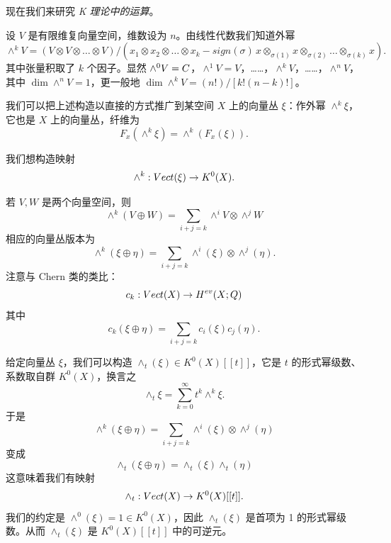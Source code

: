 现在我们来研究 \emph{K 理论中的运算}。

设 $V$ 是有限维复向量空间，维数设为 $n$。由线性代数我们知道外幂
\[ \wedge^k V = (V\otimes V\otimes\ldots\otimes V)/(x_1\otimes x_2\otimes\ldots\otimes x_k - sign(\sigma)\,x\otimes_{\sigma(1)}x\otimes_{\sigma(2)}\ldots\otimes_{\sigma(k)}x). \]
其中张量积取了 $k$ 个因子。显然 $\wedge^0V = C$，$\wedge^1V = V$，……，$\wedge^kV$，……，$\wedge^nV$，其中 $\dim\wedge^nV = 1$，更一般地 $\dim\wedge^kV = (n!)/[k!(n-k)!]$。

我们可以把上述构造以直接的方式推广到某空间 $X$ 上的向量丛 $\xi$：作外幂 $\wedge^k\xi$，它也是 $X$ 上的向量丛，纤维为
\[ F_x(\wedge^k\xi) = \wedge^k(F_x(\xi)). \]

我们想构造映射
\[ \wedge^k : Vect(\xi)\to K^0(X). \]

若 $V,W$ 是两个向量空间，则
\[ \wedge^k(V\oplus W) = \sum_{i+j=k}\wedge^i V\otimes\wedge^j W \]
相应的向量丛版本为
\[ \wedge^k(\xi\oplus\eta) = \sum_{i+j=k}\wedge^i(\xi)\otimes\wedge^j(\eta). \]
注意与 Chern 类的类比：
\[ c_k : Vect(X)\to H^{ev}(X;Q) \]
其中
\[ c_k(\xi\oplus\eta) = \sum_{i+j=k}c_i(\xi)c_j(\eta). \]

给定向量丛 $\xi$，我们可以构造 $\wedge_t(\xi)\in K^0(X)[[t]]$，它是 $t$ 的形式幂级数、系数取自群 $K^0(X)$，换言之
\[ \wedge_t\xi = \sum_{k=0}^\infty t^k\wedge^k\xi. \]
于是
\[ \wedge^k(\xi\oplus\eta) = \sum_{i+j=k}\wedge^i(\xi)\otimes\wedge^j(\eta) \]
变成
\[ \wedge_t(\xi\oplus\eta) = \wedge_t(\xi)\wedge_t(\eta) \]
这意味着我们有映射
\[ \wedge_t : Vect(X)\to K^0(X)[[t]]. \]
我们的约定是 $\wedge^0(\xi) = 1\in K^0(X)$，因此 $\wedge_t(\xi)$ 是首项为 1 的形式幂级数。从而 $\wedge_t(\xi)$ 是 $K^0(X)[[t]]$ 中的可逆元。

